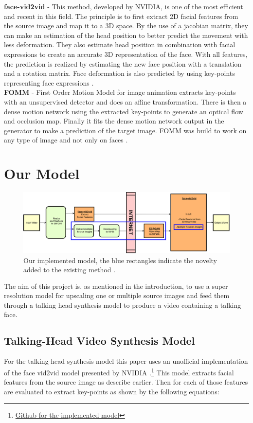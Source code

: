 \documentclass[10pt,twocolumn,letterpaper]{article}
\begin{document}
\textbf{face-vid2vid} - This method, developed by NVIDIA, is one of the most efficient and recent in this field. The principle is to first extract 2D facial features from the source image and map it to a 3D space. By the use of a jacobian matrix, they can make an estimation of the head position to better predict the movement with less deformation. They also estimate head position in combination with facial expressions to create an accurate 3D representation of the face. With all features, the prediction is realized by estimating the new face position with a translation and a rotation matrix. Face deformation is also predicted by using key-points representing face expressions \cite{Nvidia}. \\

\textbf{FOMM} - First Order Motion Model for image animation extracts key-points with an unsupervised detector and does an affine transformation. There is then a dense motion network using the extracted key-points to generate an optical flow and occlusion map. Finally it fits the dense motion network output in the generator to make a prediction of the target image. FOMM was build to work on any type of image and not only on faces \cite{FOMM}.

\section{Our Model}
\begin{figure}[ht]
    \centering
    \includegraphics[width=\textwidth]{figure/ourModel.png}
    \caption{Our implemented model, the blue rectangles indicate the novelty added to the existing method \cite{Nvidia}.}
    \label{ourModel}
\end{figure}

The aim of this project is, as mentioned in the introduction, to use a super resolution model for upscaling one or multiple source images and feed them through a talking head synthesis model to produce a video containing a talking face. 

\subsection{Talking-Head Video Synthesis Model}
For the talking-head synthesis model this paper uses an unofficial implementation of the face vid2vid model presented by NVIDIA \cite{Nvidia}.\footnote{\href{https://github.com/zhanglonghao1992/One-Shot_Free-View_Neural_Talking_Head_Synthesis}{Github for the implemented model}} This model extracts facial features from the source image as describe earlier. Then for each of those features are evaluated to extract key-points as shown by the following equations:
\end{document}
